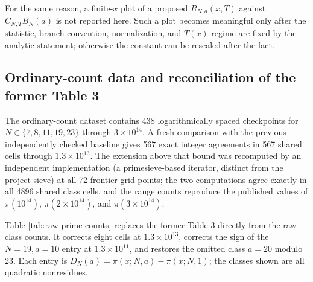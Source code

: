\documentclass[12pt,reqno]{amsart}
\theoremstyle{definition}
\theoremstyle{remark}
\numberwithin{equation}{section}
\begin{document}
For the same reason, a finite-$x$ plot of a proposed
$R_{N,a}(x,T)$ against $C_{N,T}B_N(a)$ is not reported here.  Such a plot becomes
meaningful only after the statistic, branch convention, normalization, and
$T(x)$ regime are fixed by the analytic statement; otherwise the constant can
be rescaled after the fact.

\subsection{Ordinary-count data and reconciliation of the former Table 3}

The ordinary-count dataset contains 438 logarithmically spaced checkpoints for
$N\in\{7,8,11,19,23\}$ through $3\times10^{14}$.  A fresh comparison with the
previous independently checked baseline gives 567 exact integer agreements in
567 shared cells through $1.3\times10^{13}$.  The extension above that bound
was recomputed by an independent implementation (a primesieve-based iterator,
distinct from the project sieve) at all 72 frontier grid points; the two
computations agree exactly in all 4896 shared class cells, and the range
counts reproduce the published values of $\pi(10^{14})$, $\pi(2\times10^{14})$,
and $\pi(3\times10^{14})$.

Table \ref{tab:raw-prime-counts} replaces the former Table 3 directly from the
raw class counts.  It corrects eight cells at $1.3\times10^{13}$, corrects the
sign of the $N=19,a=10$ entry at $1.3\times10^{11}$, and restores the omitted
class $a=20$ modulo 23.  Each entry is
$D_N(a)=\pi(x;N,a)-\pi(x;N,1)$; the classes shown are all quadratic
nonresidues.
\end{document}

